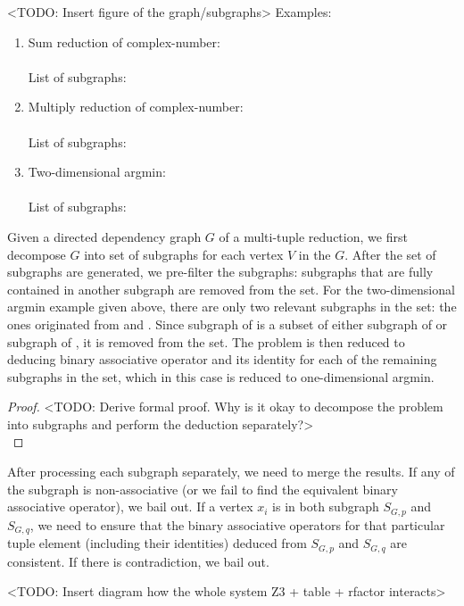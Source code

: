 <TODO: Insert figure of the graph/subgraphs>
Examples:
\begin{enumerate}
 \item Sum reduction of complex-number: \\
  \\
 List of subgraphs:  
 
 \item Multiply reduction of complex-number: \\
  \\
 List of subgraphs: 

 \item Two-dimensional argmin: \\
  \\
 List of subgraphs:  
\end{enumerate}

Given a directed dependency graph $G$ of a multi-tuple reduction, we first decompose $G$ into set of subgraphs for each vertex $V$ in the $G$. After the set of subgraphs are generated, we pre-filter the subgraphs: subgraphs that are fully contained in another subgraph are removed from the set. For the two-dimensional argmin example given above, there are only two relevant subgraphs in the set: the ones originated from  and . Since subgraph of  is a subset of either subgraph of  or subgraph of , it is removed from the set. The problem is then reduced to deducing binary associative operator and its identity for each of the remaining subgraphs in the set, which in this case is reduced to one-dimensional argmin. 

\begin{proof}
<TODO: Derive formal proof. Why is it okay to decompose the problem into subgraphs and perform the deduction separately?> \\
\end{proof}

After processing each subgraph separately, we need to merge the results. If any of the subgraph is non-associative (or we fail to find the equivalent binary associative operator), we bail out. If a vertex $x_i$ is in both subgraph $S_{G, p}$ and $S_{G, q}$, we need to ensure that the binary associative operators for that particular tuple element (including their identities) deduced from $S_{G, p}$ and $S_{G, q}$ are consistent. If there is contradiction, we bail out.  

<TODO: Insert diagram how the whole system Z3 + table + rfactor interacts>
